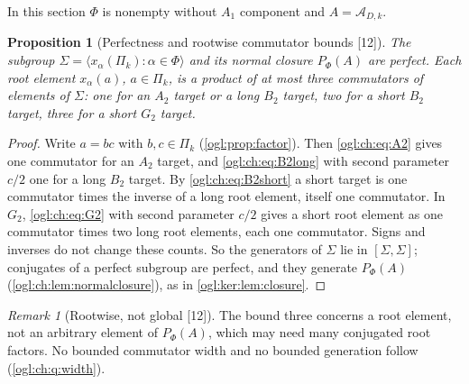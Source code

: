 \documentclass[11pt,oneside]{article}
\numberwithin{equation}{section}
\newtheorem{proposition}[proposition]{Proposition}
\theoremstyle{definition}
\theoremstyle{remark}
\newtheorem{remark}[remark]{Remark}
\newcommand{\A}{\mathcal A}
\newcommand{\src}[1]{\textup{\textsf{\small[#1]}}}
\begin{document}
In this section $\Phi$ is nonempty without $A_1$ component and $A=\A_{D,k}$.

\begin{proposition}[Perfectness and rootwise commutator bounds \src{12}]\label{ogl:ch:prop:perfect}
The subgroup $\Sigma=\langle x_\alpha(\Pi_k):\alpha\in\Phi\rangle$ and its normal
closure $P_\Phi(A)$ are perfect. Each root element $x_\alpha(a)$, $a\in\Pi_k$, is a
product of at most three commutators of elements of $\Sigma$: one for an $A_2$
target or a long $B_2$ target, two for a short $B_2$ target, three for a short
$G_2$ target.
\end{proposition}
\begin{proof}
Write $a=bc$ with $b,c\in\Pi_k$ (\cref{ogl:prop:factor}). Then \eqref{ogl:ch:eq:A2}
gives one commutator for an $A_2$ target, and \eqref{ogl:ch:eq:B2long} with second
parameter $c/2$ one for a long $B_2$ target. By \eqref{ogl:ch:eq:B2short} a
short target is one commutator times the inverse of a long root element, itself
one commutator. In $G_2$, \eqref{ogl:ch:eq:G2} with second parameter $c/2$ gives
a short root element as one commutator times two long root elements, each one
commutator. Signs and inverses do not change these counts. So the generators of
$\Sigma$ lie in $[\Sigma,\Sigma]$; conjugates of a perfect subgroup are perfect,
and they generate $P_\Phi(A)$ (\cref{ogl:ch:lem:normalclosure}), as in
\cref{ogl:ker:lem:closure}.
\end{proof}

\begin{remark}[Rootwise, not global \src{12}]\label{ogl:ch:rem:width}
The bound three concerns a root element, not an arbitrary element of $P_\Phi(A)$,
which may need many conjugated root factors. No bounded commutator width and no
bounded generation follow (\cref{ogl:ch:q:width}).
\end{remark}
\end{document}
